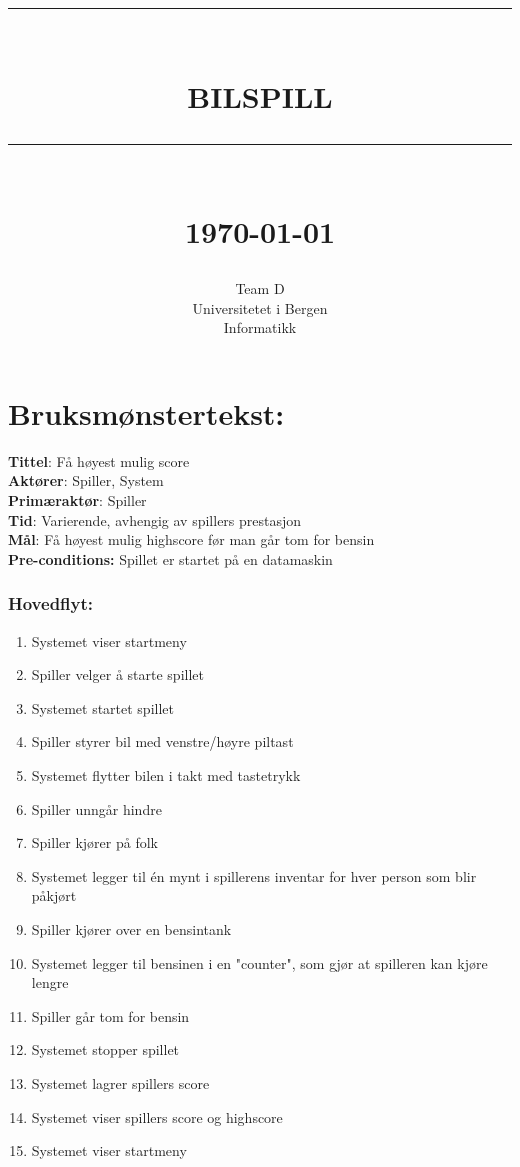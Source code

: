 \documentclass[12pt]{report}
\newcommand{\HRule}[1]{\rule{\linewidth}{#1}}
\begin{document}
\title{ \normalsize \textsc{}
		\\ [2.0cm]
		\HRule{0.5pt} \\
		\LARGE \textbf{\uppercase{Bilspill}}
		\HRule{2pt} \\ [0.5cm]
		\normalsize \today \vspace*{5\baselineskip}}
\date{}
\author{
		Team D  \\ 
		Universitetet i Bergen \\
		Informatikk }
\maketitle
\tableofcontents
\newpage
\section*{Bruksm{\o}nstertekst:}

\textbf{Tittel}: F{\aa} h{\o}yest mulig score
\bigskip \\
\textbf{Akt{\o}rer}: Spiller, System
\bigskip \\
\textbf{Prim{\ae}rakt{\o}r}: Spiller
\bigskip \\
\textbf{Tid}: Varierende, avhengig av spillers prestasjon
\bigskip \\
\textbf{M{\aa}l}: F{\aa} h{\o}yest mulig highscore f{\o}r man g{\aa}r tom for bensin
\bigskip \\
\textbf{Pre-conditions:} Spillet er startet p{\aa} en datamaskin
\subsubsection*{Hovedflyt:}
\begin{enumerate}
\item Systemet viser startmeny
\item Spiller velger {\aa} starte spillet
\item Systemet startet spillet
\item Spiller styrer bil med venstre/h{\o}yre piltast
\item Systemet flytter bilen i takt med tastetrykk
\item Spiller unng{\aa}r hindre
\item Spiller kj{\o}rer p{\aa} folk
\item Systemet legger til én mynt i spillerens inventar for hver person som blir p{\aa}kj{\o}rt
\item Spiller kj{\o}rer over en bensintank
\item Systemet legger til bensinen i en "counter", som gj{\o}r at spilleren kan kj{\o}re lengre
\item Spiller g{\aa}r tom for bensin
\item Systemet stopper spillet
\item Systemet lagrer spillers score
\item Systemet viser spillers score og highscore
\item Systemet viser startmeny
\end{enumerate}
\pagebreak
\end{document}
